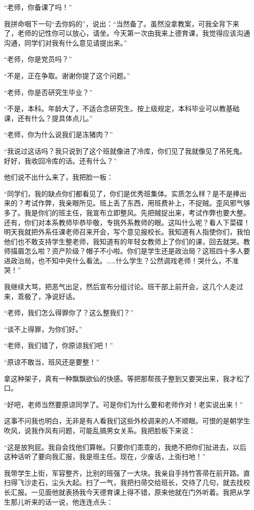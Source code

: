  “老师，你备课了吗！” 
 
 我拼命咽下一句“去你妈的”，说出：“当然备了。虽然没拿教案，可我全背下来了，老师的记性你可以放心，请坐。今天第一次由我来上德育课，我觉得应该沟通沟通，同学们对我有什么意见请提出来。” 
 
 “老师，你是党员吗？” 
 
 “不是，正在争取。谢谢你提了这个问题。” 
 
 “老师，你是否研究生毕业？” 
 
 “不是，本科。年龄大了，不适合念研究生。按上级规定，本科毕业可以教基础课，还有什么？提具体点儿。” 
 
 “老师，你为什么说我们是冻猪肉？” 
 
 “我说过这话吗？我只说到了这个班就像进了冷库，你们见了我就像见了吊死鬼。好好，我收回冷库的话。还有什么？” 
 
 他们说不出什么来了，我把脸一板： 
 
 “同学们，我的缺点你们都看见了，你们是优秀班集体。实质怎么样？是不是捧出来的？考试作弊，我亲眼所见。班上丢了东西，用班费补上，不捉贼。歪风邪气够多了。我是你们的班主任，我宣布立即整风。先把贼捉出来，考试作弊也要大整。还有，你们对本系教师毕恭毕敬，专挑外系教师的眼。这叫什么呢？看人下菜碟！明天我就把外系任课老师召来开会，写个意见报校长。我知道有人指使你们，我怕他们也不敢支持学生整老师，我知道有的年轻女教师上了你们的课，回去就哭。教师描眉怎么啦？资产阶级？帽子不小啦。你们是学生还是政治局？这班四十多人要进政治局，也不知中央什么看法。……什么学生？公然调戏老师！哭什么，不准哭！” 
 
 我继续大骂，把恶气出足，然后宣布分组讨论。班干部上前开会，这几个人走过来，乖极了，净说好话。 
 
 “老师，我们怎么得罪你了？这么整我们？” 
 
 “谈不上得罪，为你们好。” 
 
 “老师，我们错了，你原谅我们吧！” 
 
 “原谅不敢当，班风还是要整！” 
 
 拿这种架子，真有一种飘飘欲仙的快感。等把那帮孩子整到又要哭出来，我才松了口。 
 
 “好吧，老师当然要原谅同学了。可是你们为什么要和老师作对！老实说出来！” 
 
 这事不问我也明白，无非是有人看我们这些外校调来的人不顺眼。可恨的是朝学生吹风，说我作风有问题，可能乱搞男女关系。我把脸板下来说： 
 
 “这是放狗屁。我自会找他们算帐。只要你们乖乖的，我绝不把你们扯进去，以后这种话听了要向我汇报，我是班主任。现在，少废话，上街扫地！” 
 
 我带学生上街，军容整齐，比别的班强了一大块。我亲自手持竹答帚在前开路。直扫得飞沙走石，尘头大起。扫了一气，我把扫帚交给班长，交待了几句，就去找校长汇报。一见面他就表扬我今天德育课上得不错，原来他就在门外听着。我把从学生那儿听来的话一说，他连连点头： 
 
